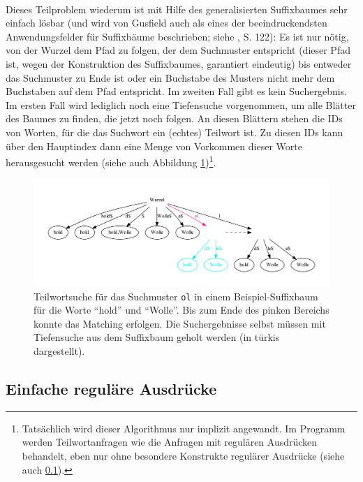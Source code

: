 \paragraph{} Dieses Teilproblem wiederum ist mit Hilfe des generalisierten Suffixbaumes sehr einfach lösbar (und wird von Gusfield auch als eines der beeindruckendsten Anwendungsfelder für Suffixbäume beschrieben; siehe \cite{gusfield}, S. 122): Es ist nur nötig, von der Wurzel dem Pfad zu folgen, der dem Suchmuster entspricht (dieser Pfad ist, wegen der Konstruktion des Suffixbaumes, garantiert eindeutig) bis entweder das Suchmuster zu Ende ist oder ein Buchstabe des Musters nicht mehr dem Buchstaben auf dem Pfad entspricht. Im zweiten Fall gibt es kein Suchergebnis. Im ersten Fall wird lediglich noch eine Tiefensuche vorgenommen, um alle Blätter des Baumes zu finden, die jetzt noch folgen. An diesen Blättern stehen die IDs von Worten, für die das Suchwort ein (echtes) Teilwort ist. Zu diesen IDs kann über den Hauptindex dann eine Menge von Vorkommen dieser Worte herausgesucht werden (siehe auch Abbildung \ref{fig-matchingSuffixTree})\footnote{Tatsächlich wird dieser Algorithmus nur implizit angewandt. Im Programm werden Teilwortanfragen wie die Anfragen mit regulären Ausdrücken behandelt, eben nur ohne besondere Konstrukte regulärer Ausdrücke (siehe auch \ref{algo-regex}).}.

\begin{figure}
\includegraphics[scale=0.5]{resources/wolleHoldMatchSuffixTree.pdf}
\caption{Teilwortsuche für das Suchmuster \texttt{ol} in einem Beispiel-Suffixbaum für die Worte "`hold"' und "`Wolle"'. Bis zum Ende des pinken Bereichs konnte das Matching erfolgen. Die Suchergebnisse selbst müssen mit Tiefensuche aus dem Suffixbaum geholt werden (in türkis dargestellt).}
\label{fig-matchingSuffixTree}
\end{figure}

\newpage

\subsection{Einfache reguläre Ausdrücke}
\label{algo-regex}

